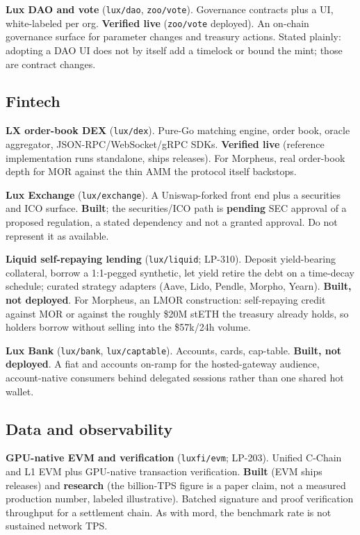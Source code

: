 \documentclass[11pt,a4paper]{article}
\newcommand{\code}[1]{\texttt{\small #1}}
\newcommand{\prov}[1]{{\color{muted}\footnotesize\sffamily[#1]}}
\begin{document}
\textbf{Lux DAO and vote} (\code{lux/dao}, \code{zoo/vote}). Governance contracts plus a UI,
white-labeled per org. \textbf{Verified live} (\code{zoo/vote} deployed). An on-chain governance
surface for parameter changes and treasury actions. Stated plainly: adopting a DAO UI does not
by itself add a timelock or bound the mint; those are contract changes.

\subsection{Fintech}

\textbf{LX order-book DEX} (\code{lux/dex}). Pure-Go matching engine, order book, oracle
aggregator, JSON-RPC/WebSocket/gRPC SDKs. \textbf{Verified live} (reference implementation runs
standalone, ships releases). For Morpheus, real order-book depth for MOR against the thin AMM
the protocol itself backstops.

\textbf{Lux Exchange} (\code{lux/exchange}). A Uniswap-forked front end plus a securities and
ICO surface. \textbf{Built}; the securities/ICO path is \textbf{pending} SEC approval of a
proposed regulation, a stated dependency and not a granted approval. Do not represent it as
available.

\textbf{Liquid self-repaying lending} (\code{lux/liquid}; LP-310). Deposit yield-bearing
collateral, borrow a 1:1-pegged synthetic, let yield retire the debt on a time-decay schedule;
curated strategy adapters (Aave, Lido, Pendle, Morpho, Yearn). \textbf{Built, not deployed}. For
Morpheus, an LMOR construction: self-repaying credit against MOR or against the roughly \$20M
stETH \prov{verified} the treasury already holds, so holders borrow without selling into the
\$57k/24h \prov{verified} volume.

\textbf{Lux Bank} (\code{lux/bank}, \code{lux/captable}). Accounts, cards, cap-table.
\textbf{Built, not deployed}. A fiat and accounts on-ramp for the hosted-gateway audience,
account-native consumers behind delegated sessions rather than one shared hot wallet.

\subsection{Data and observability}

\textbf{GPU-native EVM and verification} (\code{luxfi/evm}; LP-203). Unified C-Chain and L1 EVM
plus GPU-native transaction verification. \textbf{Built} (EVM ships releases) and
\textbf{research} (the billion-TPS figure is a paper claim, not a measured production number,
labeled illustrative). Batched signature and proof verification throughput for a settlement
chain. As with mord, the benchmark rate is not sustained network TPS.
\end{document}
